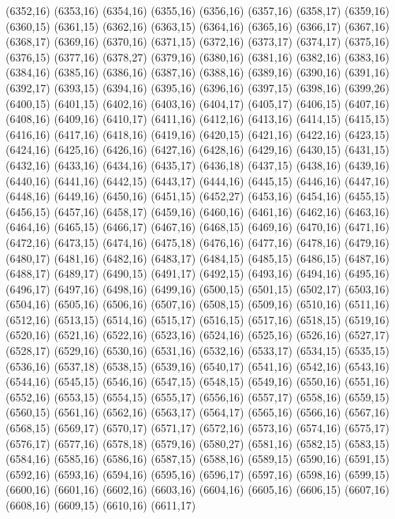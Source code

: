 (6352,16)
(6353,16)
(6354,16)
(6355,16)
(6356,16)
(6357,16)
(6358,17)
(6359,16)
(6360,15)
(6361,15)
(6362,16)
(6363,15)
(6364,16)
(6365,16)
(6366,17)
(6367,16)
(6368,17)
(6369,16)
(6370,16)
(6371,15)
(6372,16)
(6373,17)
(6374,17)
(6375,16)
(6376,15)
(6377,16)
(6378,27)
(6379,16)
(6380,16)
(6381,16)
(6382,16)
(6383,16)
(6384,16)
(6385,16)
(6386,16)
(6387,16)
(6388,16)
(6389,16)
(6390,16)
(6391,16)
(6392,17)
(6393,15)
(6394,16)
(6395,16)
(6396,16)
(6397,15)
(6398,16)
(6399,26)
(6400,15)
(6401,15)
(6402,16)
(6403,16)
(6404,17)
(6405,17)
(6406,15)
(6407,16)
(6408,16)
(6409,16)
(6410,17)
(6411,16)
(6412,16)
(6413,16)
(6414,15)
(6415,15)
(6416,16)
(6417,16)
(6418,16)
(6419,16)
(6420,15)
(6421,16)
(6422,16)
(6423,15)
(6424,16)
(6425,16)
(6426,16)
(6427,16)
(6428,16)
(6429,16)
(6430,15)
(6431,15)
(6432,16)
(6433,16)
(6434,16)
(6435,17)
(6436,18)
(6437,15)
(6438,16)
(6439,16)
(6440,16)
(6441,16)
(6442,15)
(6443,17)
(6444,16)
(6445,15)
(6446,16)
(6447,16)
(6448,16)
(6449,16)
(6450,16)
(6451,15)
(6452,27)
(6453,16)
(6454,16)
(6455,15)
(6456,15)
(6457,16)
(6458,17)
(6459,16)
(6460,16)
(6461,16)
(6462,16)
(6463,16)
(6464,16)
(6465,15)
(6466,17)
(6467,16)
(6468,15)
(6469,16)
(6470,16)
(6471,16)
(6472,16)
(6473,15)
(6474,16)
(6475,18)
(6476,16)
(6477,16)
(6478,16)
(6479,16)
(6480,17)
(6481,16)
(6482,16)
(6483,17)
(6484,15)
(6485,15)
(6486,15)
(6487,16)
(6488,17)
(6489,17)
(6490,15)
(6491,17)
(6492,15)
(6493,16)
(6494,16)
(6495,16)
(6496,17)
(6497,16)
(6498,16)
(6499,16)
(6500,15)
(6501,15)
(6502,17)
(6503,16)
(6504,16)
(6505,16)
(6506,16)
(6507,16)
(6508,15)
(6509,16)
(6510,16)
(6511,16)
(6512,16)
(6513,15)
(6514,16)
(6515,17)
(6516,15)
(6517,16)
(6518,15)
(6519,16)
(6520,16)
(6521,16)
(6522,16)
(6523,16)
(6524,16)
(6525,16)
(6526,16)
(6527,17)
(6528,17)
(6529,16)
(6530,16)
(6531,16)
(6532,16)
(6533,17)
(6534,15)
(6535,15)
(6536,16)
(6537,18)
(6538,15)
(6539,16)
(6540,17)
(6541,16)
(6542,16)
(6543,16)
(6544,16)
(6545,15)
(6546,16)
(6547,15)
(6548,15)
(6549,16)
(6550,16)
(6551,16)
(6552,16)
(6553,15)
(6554,15)
(6555,17)
(6556,16)
(6557,17)
(6558,16)
(6559,15)
(6560,15)
(6561,16)
(6562,16)
(6563,17)
(6564,17)
(6565,16)
(6566,16)
(6567,16)
(6568,15)
(6569,17)
(6570,17)
(6571,17)
(6572,16)
(6573,16)
(6574,16)
(6575,17)
(6576,17)
(6577,16)
(6578,18)
(6579,16)
(6580,27)
(6581,16)
(6582,15)
(6583,15)
(6584,16)
(6585,16)
(6586,16)
(6587,15)
(6588,16)
(6589,15)
(6590,16)
(6591,15)
(6592,16)
(6593,16)
(6594,16)
(6595,16)
(6596,17)
(6597,16)
(6598,16)
(6599,15)
(6600,16)
(6601,16)
(6602,16)
(6603,16)
(6604,16)
(6605,16)
(6606,15)
(6607,16)
(6608,16)
(6609,15)
(6610,16)
(6611,17)
